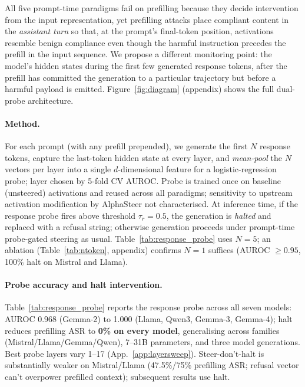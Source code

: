 \documentclass{article}
\begin{document}
All five prompt-time paradigms fail on prefilling because they decide intervention from the input representation, yet prefilling attacks place compliant content in the \emph{assistant turn} so that, at the prompt's final-token position, activations resemble benign compliance even though the harmful instruction precedes the prefill in the input sequence. We propose a different monitoring point: the model's hidden states during the first few generated response tokens, after the prefill has committed the generation to a particular trajectory but before a harmful payload is emitted. Figure~\ref{fig:diagram} (appendix) shows the full dual-probe architecture.

\paragraph{Method.}
For each prompt (with any prefill prepended), we generate the first $N$ response tokens, capture the last-token hidden state at every layer, and \emph{mean-pool} the $N$ vectors per layer into a single $d$-dimensional feature for a logistic-regression probe; layer chosen by 5-fold CV AUROC. Probe is trained once on baseline (unsteered) activations and reused across all paradigms; sensitivity to upstream activation modification by AlphaSteer not characterised. At inference time, if the response probe fires above threshold $\tau_r = 0.5$, the generation is \emph{halted} and replaced with a refusal string; otherwise generation proceeds under prompt-time probe-gated steering as usual. Table~\ref{tab:response_probe} uses $N=5$; an ablation (Table~\ref{tab:ntoken}, appendix) confirms $N=1$ suffices (AUROC $\geq 0.95$, 100\% halt on Mistral and Llama).

\paragraph{Probe accuracy and halt intervention.}
Table~\ref{tab:response_probe} reports the response probe across all seven models: AUROC 0.968 (Gemma-2) to 1.000 (Llama, Qwen3, Gemma-3, Gemma-4); halt reduces prefilling ASR to \textbf{0\% on every model}, generalising across families (Mistral/Llama/Gemma/Qwen), 7--31B parameters, and three model generations. Best probe layers vary 1--17 (App.~\ref{app:layersweep}). Steer-don't-halt is substantially weaker on Mistral/Llama (47.5\%/75\% prefilling ASR; refusal vector can't overpower prefilled context); subsequent results use halt.
\end{document}
